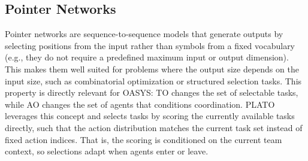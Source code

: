 


\subsection{Pointer Networks}\label{pointer_background}

Pointer networks \cite{ptr} are sequence-to-sequence models that generate outputs by selecting positions from the input rather than symbols from a fixed vocabulary (e.g., they do not require a predefined maximum input or output dimension). This makes them well suited for problems where the output size depends on the input size, such as combinatorial optimization or structured selection tasks. This property is directly relevant for OASYS: TO changes the set of selectable tasks, while AO changes the set of agents that conditions coordination. PLATO leverages this concept and selects tasks by scoring the currently available tasks directly, such that the action distribution matches the current task set instead of fixed action indices. That is, the scoring is conditioned on the current team context, so selections adapt when agents enter or leave.

